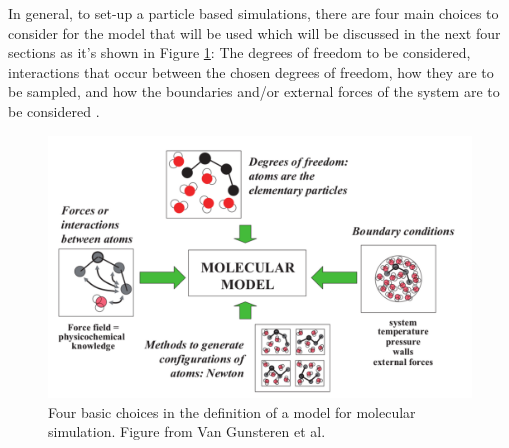 In general, to set-up a particle based simulations, there are four main choices to consider for the model that will be used which will be discussed in the next four sections as it's shown in Figure \ref{fig:md_cicle}: The degrees of freedom to be considered, interactions that occur between the chosen degrees of freedom, how they are to be sampled, and how the boundaries and/or external forces of the system are to be considered \cite{van2006biomolecular}. 
\begin{figure}[h]
    \centering
    \includegraphics[scale=0.4]{Figures/Chapter2/MD_cicle.png}
    \caption{Four basic choices in the definition of a model for molecular simulation. Figure from Van Gunsteren et al. \cite{van2006biomolecular}}
    \label{fig:md_cicle}
\end{figure}





